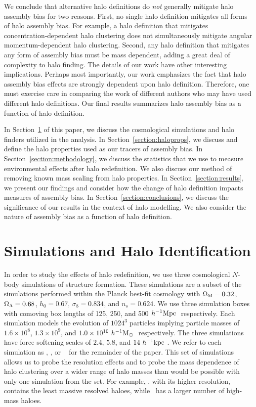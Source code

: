 \documentclass[usenatbib,fleqn]{mnras}
\begin{document}
We conclude that alternative halo definitions do {\em not} generally mitigate halo assembly bias for two reasons. First, no single halo definition mitigates all forms of halo assembly bias. For example, a halo definition that mitigates concentration-dependent halo clustering does not simultaneously mitigate angular momentum-dependent halo clustering. Second, any halo definition that mitigates any form  of assembly bias must be mass dependent, adding a great deal of complexity to halo finding. The details of our work have other interesting implications. Perhaps most importantly, our work emphasizes the fact that halo assembly bias effects are strongly dependent upon halo definition. Therefore, one must exercise care in comparing the work of different authors who may have used different halo definitions. Our final results summarizes halo assembly bias as a function of halo definition.
 
In Section~\ref{section:data} of this paper, we discuss the cosmological simulations and halo finders utilized in the analysis. In Section~\ref{section:haloprops}, we discuss and define the halo properties used as our tracers of assembly bias. In Section~\ref{section:methodology}, we discuss the statistics that we use to measure environmental effects after halo redefinition. We also discuss our method of removing known mass scaling from halo properties. In Section~\ref{section:results}, we present our findings and consider how the change of halo definition impacts measures of assembly bias. In Section~\ref{section:conclusions}, we discuss the significance of our results in the context of halo modelling. We also consider the nature of assembly bias as a function of halo definition.

\section[]{Simulations and Halo Identification}
\label{section:data}


In order to study the effects of halo redefinition, we use three cosmological $N$-body simulations of structure formation. These simulations are a subset of the  \citet{diemer_kravtsov15} simulations performed within the Planck best-fit cosmology with $\Omega_{\mathrm{M}} = 0.32$, $\Omega_{\Lambda} = 0.68$, $h_0 = 0.67$, $\sigma_8 = 0.834$, and $n_s = 0.624$. We use three simulation boxes with comoving box lengths of 125, 250, and 500$\ h^{-1}\mathrm{Mpc}~$ respectively. Each simulation models the evolution of $1024^3$ particles implying particle masses of $1.6 \times 10^8$, $1.3 \times 10^9$, and $1.0 \times 10^{10}\ h^{-1}\mathrm{M}_{\odot}~$ respectively. The three simulations have force softening scales of $2.4$, $5.8$, and $14 \ h^{-1}\mathrm{kpc}~$. We refer to each simulation as
\simA, \simB, or \simC~ for the remainder of the paper. This set of simulations allows us to probe the resolution effects and to probe the mass dependence of halo clustering over a wider range of halo masses than would be possible with only one simulation from the set. For example, \simA, with its higher resolution, contains the least massive resolved haloes, while \simC~has a larger number of high-mass haloes.
\end{document}

